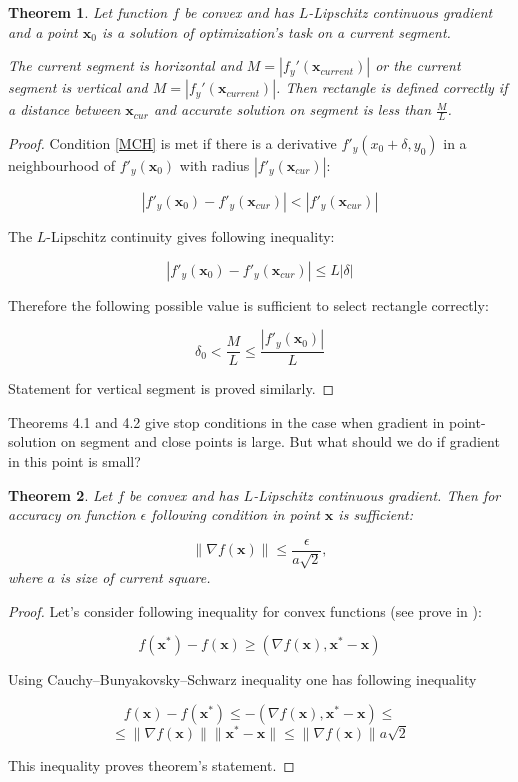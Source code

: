 \documentclass[12pt]{article}
\newtheorem{theorem}{Theorem}[section]
\begin{document}
\begin{theorem}
Let function $f$ be convex and has $L$-Lipschitz continuous gradient and a point $\textbf{x}_0$ is a solution of optimization's  task on a current segment. 

The current segment is horizontal and $M = |f_y'(\textbf{x}_{current})|$ or the current segment is vertical and $M = |f_y'(\textbf{x}_{current})|$. Then rectangle is defined correctly if a distance between $\textbf{x}_{cur}$ and accurate solution on segment is less than $\frac{M}{L}$.
\end{theorem}
\begin{proof}
Condition \eqref{MCH} is met if there is a derivative $f'_y(x_0+\delta, y_0)$ in a neighbourhood of 
$f'_y(\textbf{x}_0)$ with radius $\left|f'_y(\textbf{x}_{cur})\right|$:

$$\left|f'_y(\textbf{x}_0) - f'_y(\textbf{x}_{cur})\right|<\left|f'_y(\textbf{x}_{cur})\right|$$

The $L$-Lipschitz continuity gives following inequality:

$$\left|f'_y(\textbf{x}_0) - f'_y(\textbf{x}_{cur})\right| \leq L|\delta|$$

Therefore the following possible value is sufficient to select rectangle correctly:

$$\delta_0 < \frac{M}{L} \leq \frac{\left|f'_y(\textbf{x}_0)\right|}{L}$$

Statement for vertical segment is proved similarly.
\end{proof}

Theorems 4.1 and 4.2 give stop conditions in the case when gradient in point-solution on segment and close points is large. But what should we do if gradient in this point is small?

\begin{theorem}
Let $f$ be convex and has $L$-Lipschitz continuous gradient. Then for accuracy on function $\epsilon$ following condition in point $\textbf{x}$ is sufficient:

$$\|\nabla f(\textbf{x})\|\leq \frac{\epsilon}{a\sqrt{2}}, $$
where $a$ is size of current square.
\end{theorem}

\begin{proof}
Let's consider following inequality for convex functions (see prove in \cite{Nesterov}):

$$f(\textbf{x}^*) - f(\textbf{x}) \geq (\nabla f(\textbf{x}), \textbf{x}^* - \textbf{x} )$$

Using  Cauchy–Bunyakovsky–Schwarz inequality one has following inequality

$$f(\textbf{x}) - f(\textbf{x}^*) \leq -(\nabla f(\textbf{x}), \textbf{x}^* - \textbf{x} )\leq$$
$$\leq \|\nabla f(\textbf{x})\| \|\textbf{x}^* - \textbf{x}\|\leq \|\nabla f(\textbf{x})\|a\sqrt{2}$$

This inequality proves theorem's statement.
\end{proof}
\end{document}

